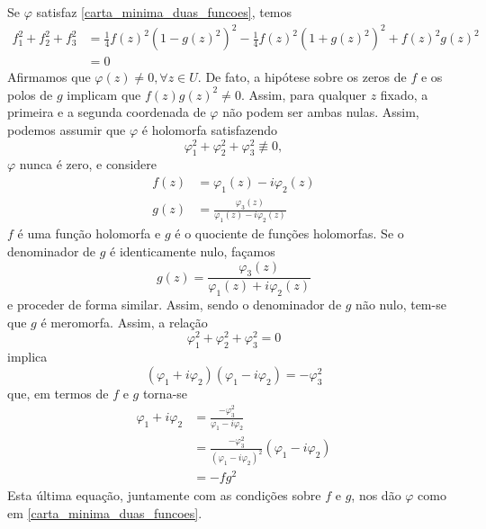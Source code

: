 \begin{demonstracao}
	Se $\varphi$ satisfaz \eqref{carta_minima_duas_funcoes}, temos
	\begin{align*}
	f_1^2 + f_2^2 + f_3^2 &= \frac{1}{4} f(z)^2 (1 - g(z)^2)^2 - \frac{1}{4} f(z)^2 (1 + g(z)^2)^2 + f(z)^2 g(z)^2\\
	&= 0
	\end{align*}
	Afirmamos que $\varphi(z) \neq 0, \forall z \in U$. De fato, a hipótese sobre os zeros de $f$ e os polos de $g$ implicam que $f(z) g(z)^2 \neq 0$. Assim, para qualquer $z$ fixado, a primeira e a segunda coordenada de $\varphi$ não podem ser ambas nulas.
	Assim, podemos assumir que $\varphi$ é holomorfa satisfazendo
	\begin{equation*}
	\varphi_1^2 + \varphi_2^2 + \varphi_3^2 \not\equiv 0,
	\end{equation*}
	$\varphi$ nunca é zero, e considere
	\begin{align*}
	f(z) &= \varphi_1(z) - i \varphi_2(z)\\
	g(z) &= \frac{\varphi_3(z)}{\varphi_1(z) - i \varphi_2(z)}
	\end{align*}
	$f$ é uma função holomorfa e $g$ é o quociente de funções holomorfas. Se o denominador de $g$ é identicamente nulo, façamos
	\begin{equation*}
	g(z) = \frac{\varphi_3(z)}{\varphi_1(z) + i \varphi_2(z)}
	\end{equation*}
	e proceder de forma similar.
	Assim, sendo o denominador de $g$ não nulo, tem-se que $g$ é meromorfa. Assim, a relação
	\begin{equation*}
	\varphi_1^2 + \varphi_2^2 + \varphi_3^2 = 0
	\end{equation*}
	implica
	\begin{equation*}
	(\varphi_1 + i \varphi_2)(\varphi_1 - i \varphi_2) = -\varphi_3^2
	\end{equation*}
	que, em termos de $f$ e $g$ torna-se
	\begin{align*}
	\varphi_1 + i \varphi_2 &= \frac{-\varphi_3^2}{\varphi_1 - i \varphi_2}\\
	&= \frac{-\varphi_3^2}{(\varphi_1 - i \varphi_2)^2} (\varphi_1 - i \varphi_2)\\
	&= -fg^2
	\end{align*}
	Esta última equação, juntamente com as condições sobre $f$ e $g$, nos dão $\varphi$ como em \eqref{carta_minima_duas_funcoes}.
\end{demonstracao}

